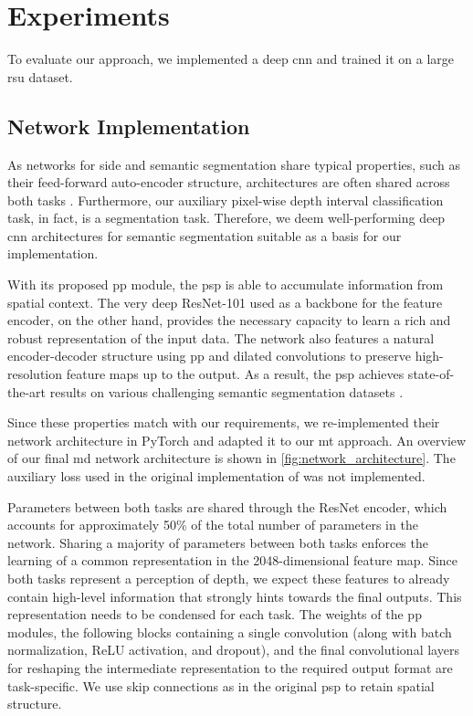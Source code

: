 \documentclass[lang=english]{tumarxivarticle}
\newcommand{\citep}{\parencite}
\newcommand{\citet}{\textcite}
\begin{document}
\section{Experiments}

To evaluate our approach, we implemented a deep \gls{cnn} and trained it on a large \gls{rsu} dataset.

\subsection{Network Implementation}

As networks for \gls{side} and semantic segmentation share typical properties, such as their feed-forward auto-encoder structure, architectures are often shared across both tasks \citep{Laina16,Li17}.
Furthermore, our auxiliary pixel-wise depth interval classification task, in fact, is a segmentation task.
Therefore, we deem well-performing deep \gls{cnn} architectures for semantic segmentation suitable as a basis for our implementation.

With its proposed \gls{pp} module, the \gls{psp} \citep{Zhao17} is able to accumulate information from spatial context.
The very deep ResNet-101 \citep{He16} used as a backbone for the feature encoder, on the other hand, provides the necessary capacity to learn a rich and robust representation of the input data.
The network also features a natural encoder-decoder structure using \gls{pp} and dilated convolutions \citep{Chen14,Yu16} to preserve high-resolution feature maps up to the output.
As a result, the \gls{psp} achieves state-of-the-art results on various challenging semantic segmentation datasets \citep{Zhao17}.

Since these properties match with our requirements, we re-implemented their network architecture in PyTorch and adapted it to our \gls{mt} approach.
An overview of our final \gls{md} network architecture is shown in \cref{fig:network_architecture}.
The auxiliary loss used in the original implementation of \citet{Zhao17} was not implemented.

Parameters between both tasks are shared through the ResNet encoder, which accounts for approximately 50\% of the total number of parameters in the network.
Sharing a majority of parameters between both tasks enforces the learning of a common representation in the 2048-dimensional feature map.
Since both tasks represent a perception of depth, we expect these features to already contain high-level information that strongly hints towards the final outputs.
This representation needs to be condensed for each task.
The weights of the \gls{pp} modules, the following blocks containing a single convolution (along with batch normalization, ReLU activation, and dropout), and the final convolutional layers for reshaping the intermediate representation to the required output format are task-specific.
We use skip connections as in the original \gls{psp} to retain spatial structure.
\end{document}

